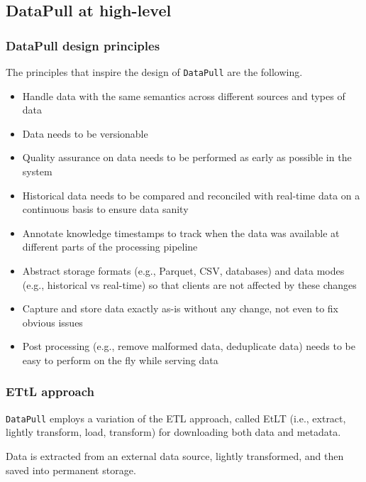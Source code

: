 \documentclass[11pt, reqno]{amsart}
\theoremstyle{definition}
\theoremstyle{remark}
\begin{document}
\subsection{DataPull at high-level}

\subsubsection{DataPull design principles}
The principles that inspire the design of \verb|DataPull| are the following.

\begin{itemize}
  \item Handle data with the same semantics across different sources and types
        of data
  \item Data needs to be versionable
  \item Quality assurance on data needs to be performed as early as possible in
        the system
  \item Historical data needs to be compared and reconciled with real-time data
        on a continuous basis to ensure data sanity
  \item Annotate knowledge timestamps to track when the data was available
        at different parts of the processing pipeline
  \item Abstract storage formats (e.g., Parquet, CSV, databases) and data modes
        (e.g., historical vs real-time) so that clients are not affected by
        these changes
  \item Capture and store data exactly as-is without any change, not even to
        fix obvious issues
  \item Post processing (e.g., remove malformed data, deduplicate data) needs
        to be easy to perform on the fly while serving data
\end{itemize}

\subsubsection{ETtL approach}
\verb|DataPull| employs a variation of the ETL approach, called EtLT (i.e.,
extract, lightly transform, load, transform) for downloading both data and
metadata.

Data is extracted from an external data source, lightly transformed, and
then saved into permanent storage.
\end{document}
